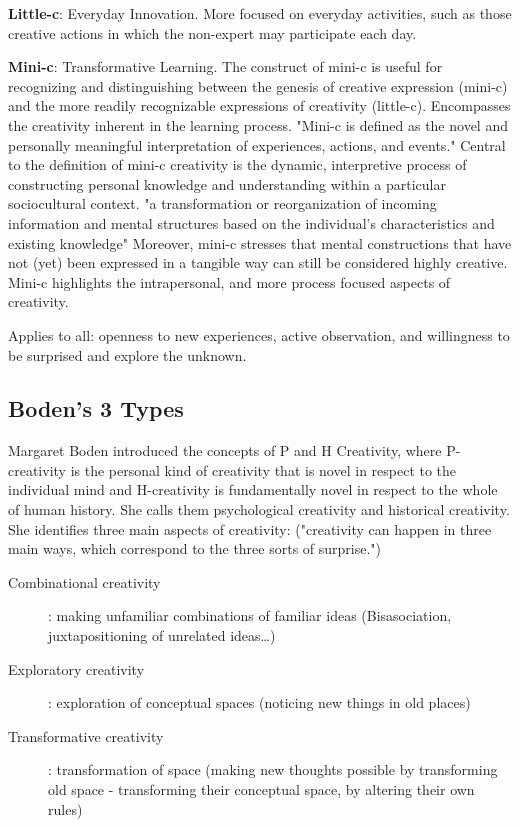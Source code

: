 \textbf{Little-c}: Everyday Innovation. More focused on everyday activities, such as those creative actions in which the non-expert may participate each day.

\textbf{Mini-c}: Transformative Learning. The construct of mini-c is useful for recognizing and distinguishing between the genesis of creative expression (mini-c) and the more readily recognizable expressions of creativity (little-c). Encompasses the creativity inherent in the learning process. "Mini-c is defined as the novel and personally meaningful interpretation of experiences, actions, and events." \citep{Beghetto2007} Central to the definition of mini-c creativity is the dynamic, interpretive process of constructing personal knowledge and understanding within a particular sociocultural context. "a transformation or reorganization of incoming information and mental structures based on the individual's characteristics and existing knowledge" \citep[p.63]{Moran2003} Moreover, mini-c stresses that mental constructions that have not (yet) been expressed in a tangible way can still be considered highly creative. Mini-c highlights the intrapersonal, and more process focused aspects of creativity.

Applies to all: openness to new experiences, active observation, and willingness to be surprised and explore the unknown.

\subsection{Boden's 3 Types}\citep{Boden2003}

Margaret Boden \citep{Boden2003} introduced the concepts of P and H Creativity, where P-creativity is the personal kind of creativity that is novel in respect to the individual mind and H-creativity is fundamentally novel in respect to the whole of human history. She calls them psychological creativity and historical creativity. She identifies three main aspects of creativity: ("creativity can happen in three main ways, which correspond to the three sorts of surprise.")

\begin{description}
  \item [Combinational creativity]: making unfamiliar combinations of familiar ideas (Bisasociation, juxtapositioning of unrelated ideas…)
  \item [Exploratory creativity]: exploration of conceptual spaces (noticing new things in old places)
  \item [Transformative creativity]: transformation of space (making new thoughts possible by transforming old space - transforming their conceptual space, by altering their own rules)
\end{description}

